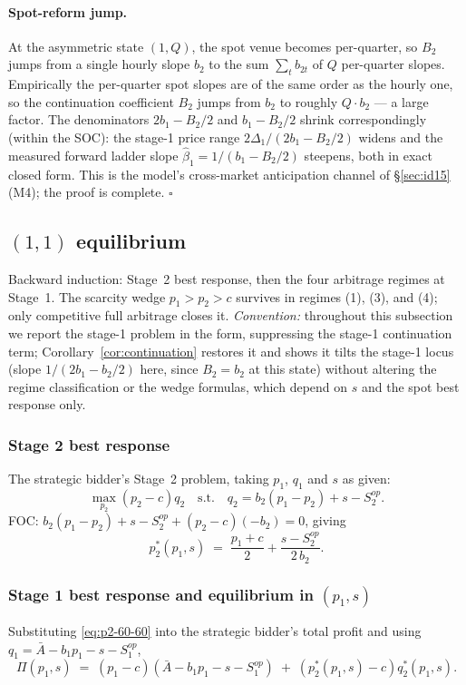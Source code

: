 \documentclass[11pt,a4paper]{article}
\theoremstyle{definition}
\theoremstyle{remark}
\theoremstyle{plain}
\begin{document}
\paragraph{Spot-reform jump.} At the asymmetric state $(1, Q)$, the spot venue becomes per-quarter, so $B_2$ jumps from a single hourly slope $b_2$ to the sum $\sum_t b_{2t}$ of $Q$ per-quarter slopes. Empirically the per-quarter spot slopes are of the same order as the hourly one, so the continuation coefficient $B_2$ jumps from $b_2$ to roughly $Q \cdot b_2$ --- a large factor. The denominators $2 b_1 - B_2/2$ and $b_1 - B_2/2$ shrink correspondingly (within the SOC): the stage-1 price range $2\Delta_1/(2 b_1 - B_2/2)$ widens and the measured forward ladder slope $\hat\beta_1 = 1/(b_1 - B_2/2)$ steepens, both in exact closed form. This is the model's cross-market anticipation channel of \S\ref{sec:id15}(M4); the proof is complete. $\square$

\subsection{$(1,1)$ equilibrium}\label{sec:state-60-60-app}

Backward induction: Stage~2 best response, then the four arbitrage regimes at Stage~1. The scarcity wedge $p_1 > p_2 > c$ survives in regimes (1), (3), and (4); only competitive full arbitrage closes it. \emph{Convention:} throughout this subsection we report the stage-1 problem in the \citeauthor{ito_reguant_2016} form, suppressing the stage-1 continuation term; Corollary~\ref{cor:continuation} restores it and shows it tilts the stage-1 locus (slope $1/(2b_1 - b_2/2)$ here, since $B_2 = b_2$ at this state) without altering the regime classification or the wedge formulas, which depend on $s$ and the spot best response only.

\subsubsection{Stage 2 best response}
The strategic bidder's Stage~2 problem, taking $p_1$, $q_1$ and $s$ as given:
\[
\max_{p_2} (p_2 - c) q_2 \quad\text{s.t.}\quad q_2 = b_2(p_1 - p_2) + s - S^{op}_2.
\]
FOC: $b_2(p_1 - p_2) + s - S^{op}_2 + (p_2 - c)(-b_2) = 0$, giving
\begin{equation}
p_2^*(p_1, s) \;=\; \frac{p_1 + c}{2} + \frac{s - S^{op}_2}{2\, b_2}.
\label{eq:p2-60-60}
\end{equation}

\subsubsection{Stage 1 best response and equilibrium in $(p_1, s)$}
Substituting \eqref{eq:p2-60-60} into the strategic bidder's total profit and using $q_1 = \bar A - b_1 p_1 - s - S^{op}_1$,
\[
\Pi(p_1, s) \;=\; (p_1 - c)(\bar A - b_1 p_1 - s - S^{op}_1) \;+\; (p_2^*(p_1, s) - c) q_2^*(p_1, s).
\]
\end{document}
